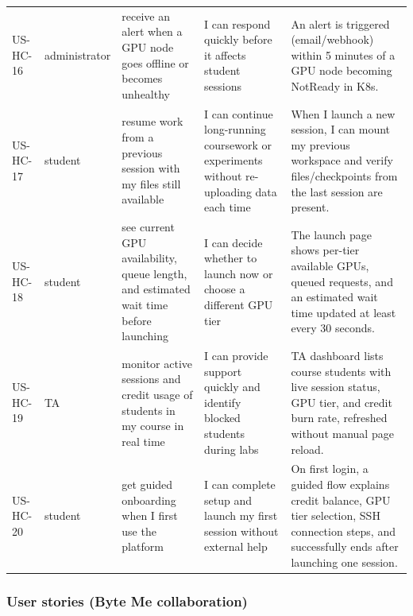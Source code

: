 \documentclass[12pt,a4paper]{article}
\begin{document}
\begin{longtable}{@{}L{2.3cm}L{2.3cm}L{4cm}L{3.5cm}L{3.5cm}@{}}
    US-HC-16 & administrator & receive an alert when a GPU node goes offline or becomes unhealthy & I can respond quickly before it affects student sessions & An alert is triggered (email/webhook) within 5 minutes of a GPU node becoming NotReady in K8s. \\
  US-HC-17 & student & resume work from a previous session with my files still available & I can continue long-running coursework or experiments without re-uploading data each time & When I launch a new session, I can mount my previous workspace and verify files/checkpoints from the last session are present. \\
    US-HC-18 & student & see current GPU availability, queue length, and estimated wait time before launching & I can decide whether to launch now or choose a different GPU tier & The launch page shows per-tier available GPUs, queued requests, and an estimated wait time updated at least every 30 seconds. \\
  US-HC-19 & TA & monitor active sessions and credit usage of students in my course in real time & I can provide support quickly and identify blocked students during labs & TA dashboard lists course students with live session status, GPU tier, and credit burn rate, refreshed without manual page reload. \\
    US-HC-20 & student & get guided onboarding when I first use the platform & I can complete setup and launch my first session without external help & On first login, a guided flow explains credit balance, GPU tier selection, SSH connection steps, and successfully ends after launching one session. \\
\end{longtable}

\subsubsection{User stories (Byte Me collaboration)}
\end{document}
